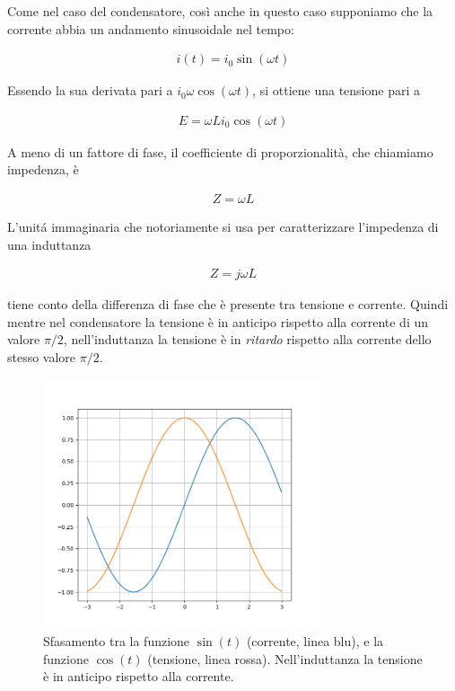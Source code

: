 \documentclass[17pt]{extarticle}
\begin{document}
\begin{enumerate}
 


Come nel caso del condensatore, così anche in questo caso supponiamo che la corrente abbia un andamento sinusoidale nel tempo:

\begin{eqnarray}
	i(t) = i_0 \sin(\omega t)
\end{eqnarray}

Essendo la sua derivata pari a $i_0\omega \cos(\omega t)$, si ottiene una tensione pari a

\begin{eqnarray}
	E = \omega L i_0\cos(\omega t)
\end{eqnarray}

A meno di un fattore di fase, il coefficiente di proporzionalità, che chiamiamo impedenza, è 

\begin{eqnarray}
	Z = \omega L
\end{eqnarray}

L'unit\'a immaginaria che notoriamente si usa per caratterizzare l'impedenza di una induttanza

\begin{eqnarray}
	Z = j\omega L
\end{eqnarray}

 tiene conto della differenza di fase che è presente tra tensione e corrente. Quindi mentre nel condensatore la tensione è in anticipo rispetto alla corrente di un valore $\pi/2$, nell'induttanza la tensione è in \emph{ritardo} rispetto alla corrente dello stesso valore $\pi/2$.


\begin{figure}[b!]		
	\centering
   	\includegraphics[width=3.2in]{sfasamento1.png}%
  	\caption{Sfasamento tra la funzione $\sin(t)$ (corrente, linea blu), e la funzione $\cos(t)$ (tensione, linea rossa). Nell'induttanza la tensione è in anticipo rispetto alla corrente.}
   	\label{fig:sfasamento1}
\end{figure}





\end{enumerate}
\end{document}
